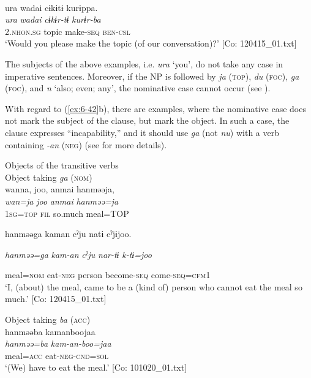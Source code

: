 \begin{table}
\ex{}\\
{\TM}
\glll  ura  {\textbar}wadai{\textbar}  cɨkɨtɨ  kurɨppa.\\
\textit{ura}  \textit{wadai}  \textit{cɨkɨr-tɨ}  \textit{kurɨr-ba}\\
2.\textsc{nhon}.\textsc{sg}  topic  make-\textsc{seq}  \textsc{ben}-\textsc{csl}\\
\glt ‘Would you please make the topic (of our conversation)?’ [Co: 120415\_01.txt]
\z

The subjects of the above examples, i.e. \textit{ura} ‘you’, do not take any case in imperative sentences. Moreover, if the NP is followed by \textit{ja} (\textsc{top}), \textit{du} (\textsc{foc}), \textit{ga} (\textsc{foc}), and \textit{n} ‘also; even; any’, the nominative case cannot occur (see ).

  With regard to (\ref{ex:6-42}b), there are examples, where the nominative case does not mark the subject of the clause, but mark the object. In such a case, the clause expresses “incapability,” and it should use \textit{ga} (not \textit{nu}) with a verb containing \textit{-an} (\textsc{neg}) (see  for more details).

\ea\label{ex:6-45}
 Objects of the transitive verbs\\

 \ea Object taking \textit{ga} (\textsc{nom})\\
{\TM}
\glll  wanna,  joo,  anmai  hanməəja,\\
\textit{wan=ja}  \textit{joo}  \textit{anmai}  \textit{hanməə=ja}\\
1\textsc{sg}=\textsc{top}  \textsc{fil}  so.much  meal=TOP

      hanməəga  kaman  cˀju  natɨ  cˀjɨjoo.

      \textit{hanməə=ga}  \textit{kam-an}  \textit{cˀju}  \textit{nar-tɨ}  \textit{k-tɨ=joo}

      meal=\textsc{nom}  eat-\textsc{neg}  person  become-\textsc{seq}  come-\textsc{seq}=\textsc{cfm}1\\
\glt ‘I, (about) the meal, came to be a (kind of) person who cannot eat the meal so much.’ [Co: 120415\_01.txt]
\z

\ex Object taking \textit{ba} (\textsc{acc})\\
{\TM}
\glll  hanməəba  kamanboojaa\\
\textit{hanməə=ba}  \textit{kam-an-boo=jaa}\\
meal=\textsc{acc}  eat-\textsc{neg}-\textsc{cnd}=\textsc{sol}\\
\glt ‘(We) have to eat the meal.’ [Co: 101020\_01.txt]
\z


\end{table}

